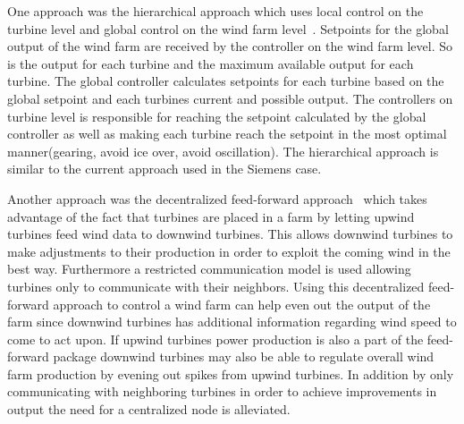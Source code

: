 One approach was the hierarchical approach which uses local control on the turbine level and global control on the wind farm level~\cite{HeirarchicalWindFarmControl}.
Setpoints for the global output of the wind farm are received by the controller on the wind farm level.
So is the output for each turbine and the maximum available output for each turbine.
The global controller calculates setpoints for each turbine based on the global setpoint and each turbines current and possible output.
The controllers on turbine level is responsible for reaching the setpoint calculated by the global controller as well as making each turbine reach the setpoint in the most optimal manner(gearing, avoid ice over, avoid oscillation).
The hierarchical approach is similar to the current approach used in the Siemens case.

Another approach was the decentralized feed-forward approach~\cite{DecentralisedFeedforwardControlOfWindFarms} which takes advantage of the fact that turbines are placed in a farm by letting upwind turbines feed wind data to downwind turbines. 
This allows downwind turbines to make adjustments to their production in order to exploit the coming wind in the best way.
Furthermore a restricted communication model is used allowing turbines only to communicate with their neighbors.
Using this decentralized feed-forward approach to control a wind farm can help even out the output of the farm since downwind turbines has additional information regarding wind speed to come to act upon. If upwind turbines power production is also a part of the feed-forward package downwind turbines may also be able to regulate overall wind farm production by evening out spikes from upwind turbines.
In addition by only communicating with neighboring turbines in order to achieve improvements in output the need for a centralized node is alleviated.

